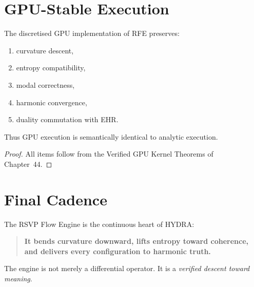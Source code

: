 \section{GPU-Stable Execution}

\begin{theorem}\label{thm:47-gpu}
The discretised GPU implementation of RFE preserves:
\begin{enumerate}
\item curvature descent,
\item entropy compatibility,
\item modal correctness,
\item harmonic convergence,
\item duality commutation with EHR.
\end{enumerate}
Thus GPU execution is semantically identical to analytic execution.
\end{theorem}

\begin{proof}
All items follow from the Verified GPU Kernel Theorems of Chapter~44.  
\end{proof}

\section{Final Cadence}

The RSVP Flow Engine is the continuous heart of HYDRA:

\begin{quote}
\textbf{
It bends curvature downward,
lifts entropy toward coherence,
and delivers every configuration to harmonic truth.
}
\end{quote}

The engine is not merely a differential operator.  
It is a \emph{verified descent toward meaning}.

